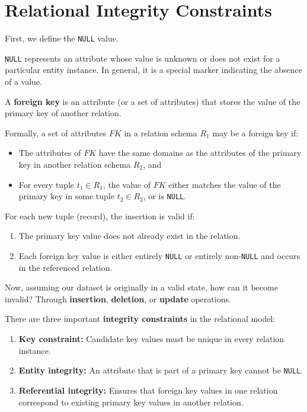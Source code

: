 \section{Relational Integrity Constraints}

First, we define the \texttt{NULL} value.  

\texttt{NULL} represents an attribute whose value is unknown or does not exist for a particular entity instance. In general, it is a special marker indicating the absence of a value.  

A \textbf{foreign key} is an attribute (or a set of attributes) that stores the value of the primary key of another relation.  

Formally, a set of attributes \(FK\) in a relation schema \(R_1\) may be a foreign key if:
\begin{itemize}
  \item The attributes of \(FK\) have the same domains as the attributes of the primary key in another relation schema \(R_2\), and
  \item For every tuple \(t_1 \in R_1\), the value of \(FK\) either matches the value of the primary key in some tuple \(t_2 \in R_2\), or is \texttt{NULL}.
\end{itemize}

For each new tuple (record), the insertion is valid if:
\begin{enumerate}
  \item The primary key value does not already exist in the relation.  
  \item Each foreign key value is either entirely \texttt{NULL} or entirely non-\texttt{NULL} and occurs in the referenced relation.  
\end{enumerate}

Now, assuming our dataset is originally in a valid state, how can it become invalid? Through \textbf{insertion}, \textbf{deletion}, or \textbf{update} operations.  

There are three important \textbf{integrity constraints} in the relational model:

\begin{enumerate}
  \item \textbf{Key constraint:} Candidate key values must be unique in every relation instance.  
  \item \textbf{Entity integrity:} An attribute that is part of a primary key cannot be \texttt{NULL}.  
  \item \textbf{Referential integrity:} Ensures that foreign key values in one relation correspond to existing primary key values in another relation.  
\end{enumerate}

